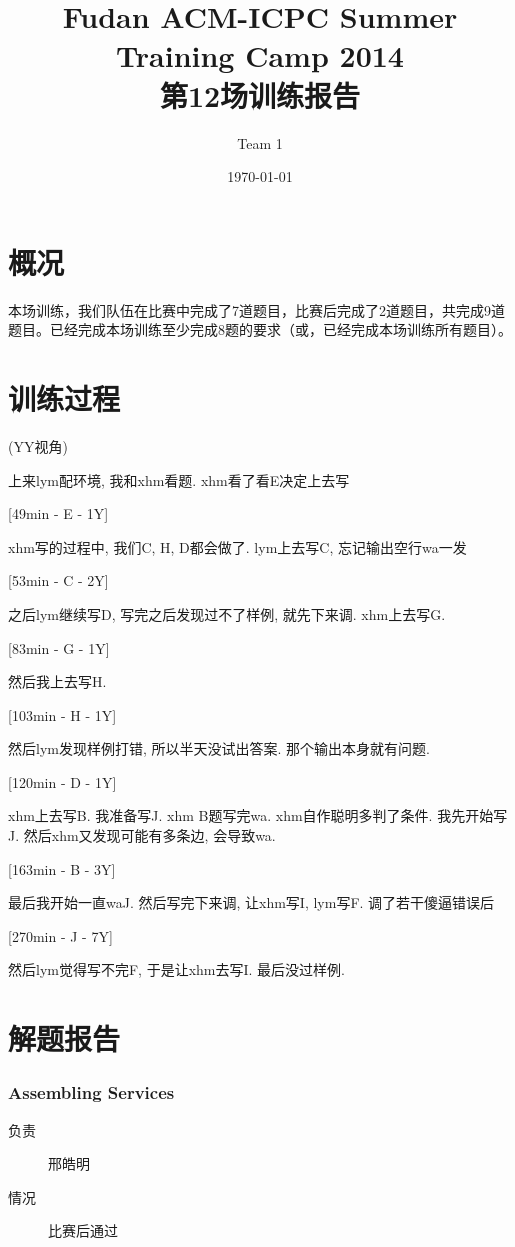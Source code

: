 \documentclass[a4paper, 11pt, nofonts, nocap, fancyhdr]{ctexart}
\title{Fudan ACM-ICPC Summer Training Camp 2014\\第12场训练报告}
\author{Team 1}
\date{\today}
\newcommand{\problem}[1]{\subsubsection{#1}}
\begin{document}
\maketitle

\section{概况}

本场训练，我们队伍在比赛中完成了7道题目，比赛后完成了2道题目，共完成9道题目。已经完成本场训练至少完成8题的要求（或，已经完成本场训练所有题目）。

\section{训练过程}

(YY视角)

上来lym配环境, 我和xhm看题.	xhm看了看E决定上去写

[49min - E - 1Y]

xhm写的过程中, 我们C, H, D都会做了. lym上去写C, 忘记输出空行wa一发

[53min - C - 2Y]

之后lym继续写D, 写完之后发现过不了样例, 就先下来调. xhm上去写G. 

[83min - G - 1Y]

然后我上去写H.

[103min - H - 1Y]

然后lym发现样例打错, 所以半天没试出答案. 那个输出本身就有问题.

[120min - D - 1Y]

xhm上去写B. 我准备写J. xhm B题写完wa. xhm自作聪明多判了条件. 我先开始写J. 然后xhm又发现可能有多条边, 会导致wa.

[163min - B - 3Y]

最后我开始一直waJ. 然后写完下来调, 让xhm写I, lym写F. 调了若干傻逼错误后

[270min - J - 7Y]

然后lym觉得写不完F, 于是让xhm去写I. 最后没过样例.

\section{解题报告}

\problem{Assembling Services}

\begin{description}
\item[负责] 邢皓明
\item[情况] 比赛后通过
\end{description}
\end{document}
